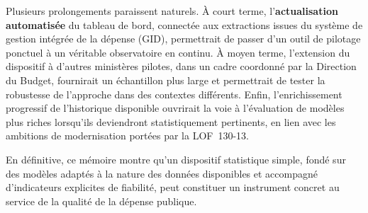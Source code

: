 \documentclass[12pt,a4paper]{article}
\begin{document}
Plusieurs prolongements paraissent naturels. \`A court terme, l'\textbf{actualisation
automatis\'ee} du tableau de bord, connect\'ee aux extractions issues du syst\`eme
de gestion int\'egr\'ee de la d\'epense (GID), permettrait de passer d'un outil
de pilotage ponctuel \`a un v\'eritable observatoire en continu. \`A moyen terme,
l'extension du dispositif \`a d'autres minist\`eres pilotes, dans un cadre
coordonn\'e par la Direction du Budget, fournirait un \'echantillon plus large
et permettrait de tester la robustesse de l'approche dans des contextes
diff\'erents. Enfin, l'enrichissement progressif de l'historique disponible
ouvrirait la voie \`a l'\'evaluation de mod\`eles plus riches lorsqu'ils
deviendront statistiquement pertinents, en lien avec les ambitions de
modernisation port\'ees par la LOF~130-13.

\medskip

En d\'efinitive, ce m\'emoire montre qu'un dispositif statistique simple,
fond\'e sur des mod\`eles adapt\'es \`a la nature des donn\'ees disponibles
et accompagn\'e d'indicateurs explicites de fiabilit\'e, peut constituer un
instrument concret au service de la qualit\'e de la d\'epense publique.

\newpage



\end{document}
